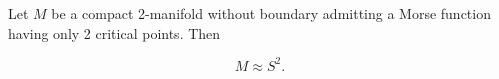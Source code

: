 Let $M$ be a compact 2-manifold without boundary admitting a Morse function having only 2 critical points. Then

$$M \approx S^2.$$

